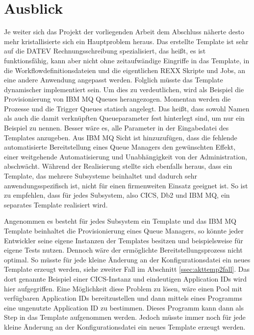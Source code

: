 \chapter{Ausblick}\label{ch:ausblick}
Je weiter sich das Projekt der vorliegenden Arbeit dem Abschluss näherte desto mehr kristallisierte sich ein Hauptproblem heraus.
Das erstellte Template ist sehr auf die DATEV Rechnungsschreibung spezialisiert, das heißt, es ist funktionsfähig, kann aber nicht ohne zeitaufwändige Eingriffe in das Template, in die Workflowdefinitionsdateien und die eigentlichen REXX Skripte und Jobs, an eine andere Anwendung angepasst werden. 
Folglich müsste das Template dynamischer implementiert sein.
Um dies zu verdeutlichen, wird als Beispiel die Provisionierung von IBM MQ Queues herangezogen.
Momentan werden die Prozesse und die Trigger Queues  statisch angelegt.
Das heißt, dass sowohl Namen als auch die damit verknüpften Queueparameter fest hinterlegt sind, um nur ein Beispiel zu nennen.
Besser wäre es, alle Parameter in der Eingabedatei des Templates anzugeben.
Aus IBM MQ Sicht ist hinzuzufügen, dass die fehlende automatisierte Bereitstellung eines Queue Managers den gewünschten Effekt, einer weitgehende Automatisierung und Unabhängigkeit von der Administration, abschwächt.
Während der Realisierung stellte sich ebenfalls heraus, dass ein Template, das mehrere Subsysteme beinhaltet und dadurch sehr anwendungsspezifisch ist, nicht für einen firmenweiten Einsatz geeignet ist.
So ist zu empfehlen, dass für jedes Subsystem, also CICS, Db2 und IBM MQ, ein separates Template realisiert wird.

Angenommen es besteht für jedes Subsystem ein Template und das IBM MQ Template beinhaltet die Provisionierung eines Queue Managers, so könnte jeder Entwickler seine eigene Instanzen der Templates besitzen und beispielsweise für eigene Tests nutzen.
Dennoch wäre der ermöglichte Bereitstellungsprozess nicht optimal.
So müsste für jede kleine Änderung an der Konfigurationsdatei ein neues Template erzeugt werden, siehe zweiter Fall im Abschnitt \ref{ssec:akttemp2fall}.
Das dort genannte Beispiel einer CICS-Instanz und eindeutigen Application IDs wird hier aufgegriffen.
Eine Möglichkeit diese Problem zu lösen, wäre einen Pool mit verfügbaren Application IDs bereitzustellen und dann mittels eines Programms eine ungenutzte Application ID zu bestimmen.
Dieses Programm kann dann als Step in das Template aufgenommen werden.
Jedoch müsste immer noch für jede kleine Änderung an der Konfigurationsdatei ein neues Template erzeugt werden.

